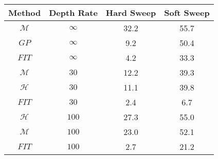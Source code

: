 \centering \begin{tabular}{c|c|c|c}
Method	&Depth Rate	&Hard Sweep	&Soft Sweep\\\hline
$\mathcal{M}$	&$\infty$	&32.2	&55.7\\
$GP$	&$\infty$	&9.2	&50.4\\
$FIT$	&$\infty$	&4.2	&33.3\\
$\mathcal{M}$	&$30$	&12.2	&39.3\\
$\mathcal{H}$	&$30$	&11.1	&39.8\\
$FIT$	&$30$	&2.4	&6.7\\
$\mathcal{H}$	&$100$	&27.3	&55.0\\
$\mathcal{M}$	&$100$	&23.0	&52.1\\
$FIT$	&$100$	&2.7	&21.2\\
\end{tabular}
